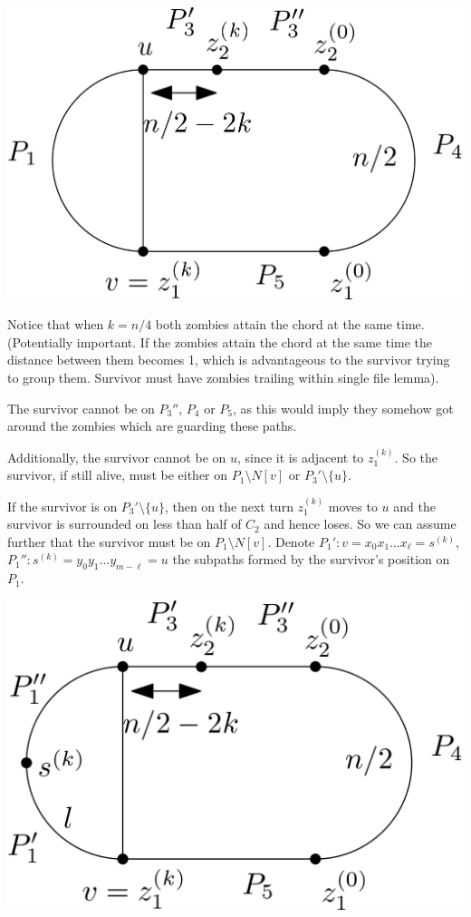 \documentclass[letterpaper, 10pt]{article}
\begin{document}
\begin{enumerate}
       \begin{center}
        \includegraphics[scale=0.15]{diagram4}
       \end{center}

       Notice that when $k = n/4$ both zombies attain the chord at the same time. (Potentially important.
       If the zombies attain the chord at the same time the distance between them becomes 1,
       which is advantageous to the survivor trying to group them. Survivor must have zombies trailing within
       single file lemma).

       The survivor cannot be on $P_3''$, $P_4$ or $P_5$, as this would imply they
       somehow got around the zombies which are guarding these paths.

       Additionally, the survivor cannot be on $u$, since it is adjacent to $z_1^{(k)}$.
       So the survivor, if still alive, must be either on $P_1 \setminus N[v]$ or $P_3' \setminus \{ u \} $.

       If the survivor is on $P_3' \setminus \{ u \}$, then on the next turn $z_1^{(k)}$ moves to $u$
       and the survivor is surrounded on less than half of $C_2$ and hence loses.
       So we can assume further that the survivor must be on $P_1 \setminus N[v]$.
       Denote $P_1' : v = x_0 x_1 \dots x_\ell = s^{(k)}$, $P_1'' : s^{(k)} = y_0 y_1 \dots y_{m-\ell} = u$
       the subpaths formed by the survivor's position on $P_1$.

       \begin{center}
        \includegraphics[scale=0.15]{diagram5}
       \end{center}


\end{enumerate}
\end{document}
